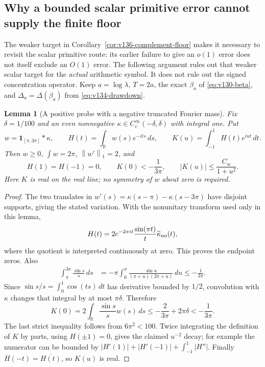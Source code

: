 \documentclass[11pt]{article}
\newtheorem{lemma}[theorem]{Lemma}
\theoremstyle{remark}
\newcommand{\norm}[1]{\left\lVert #1\right\rVert}
\begin{document}
\subsection*{Why a bounded scalar primitive error cannot supply the finite floor}

The weaker target in Corollary~\ref{cor:v136-complement-floor} makes it
necessary to revisit the scalar primitive route: its earlier failure to
give an $o(1)$ error does not itself exclude an $O(1)$ error. The following
argument rules out that weaker scalar target for the \emph{actual}
arithmetic symbol. It does not rule out the signed concentration operator.
Keep $a=\log\lambda$, $T=2a$, the exact $\beta_a$ of
\eqref{eq:v130-beta}, and $\Delta_a=\Delta(\beta_a)$ from
\eqref{eq:v134-drawdown}.

\begin{lemma}[A positive probe with a negative truncated Fourier mass]
\label{lem:v137-probe}
Fix $\delta=1/100$ and an even nonnegative
$\kappa\in C_c^\infty(-\delta,\delta)$ with integral one. Put
\[
 w=\mathbf1_{[\pi,3\pi]}*\kappa,\qquad
 H(t)=\int_{\mathbb R}w(s)e^{-its}\,ds,\qquad
 K(u)=\int_{-1}^1H(t)e^{iut}\,dt.
\]
Then $w\ge0$, $\int w=2\pi$, $\norm{w'}_1=2$, and
\begin{equation}\label{eq:v137-probe-properties}
 H(1)=H(-1)=0,\qquad
 K(0)<-\frac1{3\pi},\qquad
 |K(u)|\le\frac{C_w}{1+u^2}.
\end{equation}
Here $K$ is real on the real line; no symmetry of $w$ about zero is
required.
\end{lemma}
\begin{proof}
The two translates in $w'(s)=\kappa(s-\pi)-\kappa(s-3\pi)$ have
disjoint supports, giving the stated variation. With the nonunitary
transform used only in this lemma,
\[
 H(t)=2e^{-2\pi it}\frac{\sin(\pi t)}{t}\widehat\kappa_{\rm nu}(t),
\]
where the quotient is interpreted continuously at zero. This proves
the endpoint zeros. Also
\begin{align*}
 \int_\pi^{3\pi}\frac{\sin s}{s}\,ds
 &=-\pi\int_0^\pi
       \frac{\sin u}{(\pi+u)(2\pi+u)}\,du
 \le-\frac1{3\pi}.
\end{align*}
Since $\sin s/s=\int_0^1\cos(ts)\,dt$ has derivative bounded by
$1/2$, convolution with $\kappa$ changes that integral by at most
$\pi\delta$. Therefore
\[
 K(0)=2\int_{\mathbb R}\frac{\sin s}{s}w(s)\,ds
 \le-\frac2{3\pi}+2\pi\delta<-\frac1{3\pi}.
\]
The last strict inequality follows from $6\pi^2<100$.
Twice integrating the definition of $K$ by parts, using $H(\pm1)=0$,
gives the claimed $u^{-2}$ decay; for example the numerator can be
bounded by $|H'(1)|+|H'(-1)|+\int_{-1}^1|H''|$.
Finally $H(-t)=\overline{H(t)}$, so $K(u)$ is real.
\end{proof}
\end{document}
